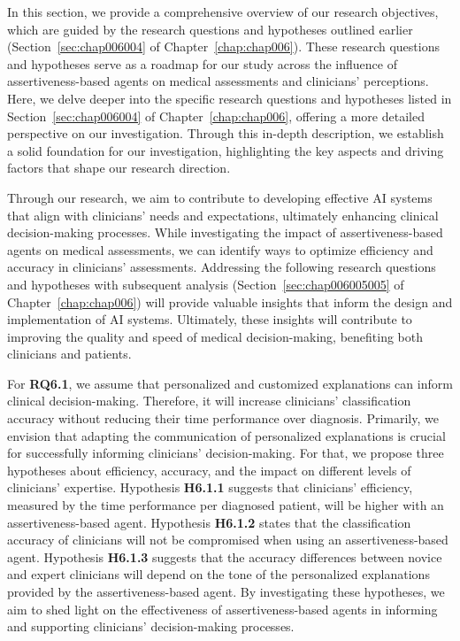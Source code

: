 In this section, we provide a comprehensive overview of our research objectives, which are guided by the research questions and hypotheses outlined earlier (Section~\ref{sec:chap006004} of Chapter~\ref{chap:chap006}).
These research questions and hypotheses serve as a roadmap for our study across the influence of assertiveness-based agents on medical assessments and clinicians' perceptions.
Here, we delve deeper into the specific research questions and hypotheses listed in Section~\ref{sec:chap006004} of Chapter~\ref{chap:chap006}, offering a more detailed perspective on our investigation.
Through this in-depth description, we establish a solid foundation for our investigation, highlighting the key aspects and driving factors that shape our research direction.

Through our research, we aim to contribute to developing effective \ac{AI} systems that align with clinicians' needs and expectations, ultimately enhancing clinical decision-making processes.
While investigating the impact of assertiveness-based agents on medical assessments, we can identify ways to optimize efficiency and accuracy in clinicians' assessments.
Addressing the following research questions and hypotheses with subsequent analysis (Section~\ref{sec:chap006005005} of Chapter~\ref{chap:chap006}) will provide valuable insights that inform the design and implementation of \ac{AI} systems.
Ultimately, these insights will contribute to improving the quality and speed of medical decision-making, benefiting both clinicians and patients.

For {\bf RQ6.1}, we assume that personalized and customized explanations can inform clinical decision-making.
Therefore, it will increase clinicians' classification accuracy without reducing their time performance over diagnosis.
Primarily, we envision that adapting the communication of personalized explanations is crucial for successfully informing clinicians' decision-making.
For that, we propose three hypotheses about efficiency, accuracy, and the impact on different levels of clinicians' expertise.
Hypothesis {\bf H6.1.1} suggests that clinicians' efficiency, measured by the time performance per diagnosed patient, will be higher with an assertiveness-based agent.
Hypothesis {\bf H6.1.2} states that the classification accuracy of clinicians will not be compromised when using an assertiveness-based agent.
Hypothesis {\bf H6.1.3} suggests that the accuracy differences between novice and expert clinicians will depend on the tone of the personalized explanations provided by the assertiveness-based agent.
By investigating these hypotheses, we aim to shed light on the effectiveness of assertiveness-based agents in informing and supporting clinicians' decision-making processes.


